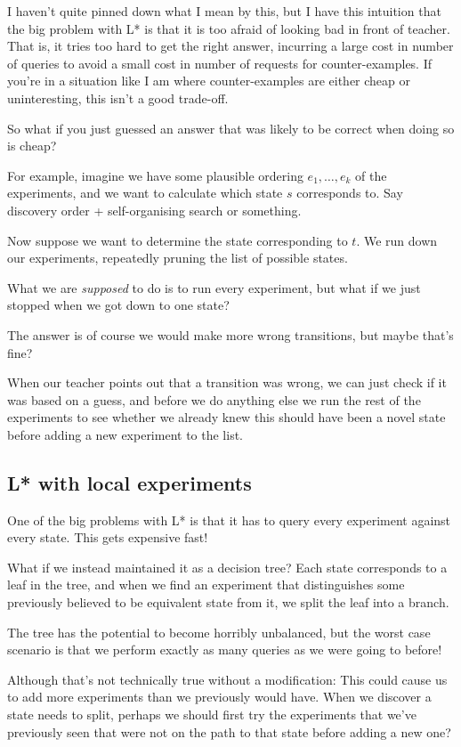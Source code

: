 \documentclass[a4paper]{book}
\begin{document}
I haven't quite pinned down what I mean by this,
but I have this intuition that the big problem with L* is that it is too afraid of looking bad in front of teacher.
That is,
it tries too hard to get the right answer,
incurring a large cost in number of queries to avoid a small cost in number of requests for counter-examples.
If you're in a situation like I am where counter-examples are either cheap or uninteresting,
this isn't a good trade-off.

So what if you just guessed an answer that was likely to be correct when doing so is cheap?

For example, imagine we have some plausible ordering \(e_1, \ldots, e_k\) of the experiments,
and we want to calculate which state \(s\) corresponds to.
Say discovery order + self-organising search or something.

Now suppose we want to determine the state corresponding to \(t\).
We run down our experiments,
repeatedly pruning the list of possible states.

What we are \emph{supposed} to do is to run every experiment,
but what if we just stopped when we got down to one state?

The answer is of course we would make more wrong transitions,
but maybe that's fine?

When our teacher points out that a transition was wrong,
we can just check if it was based on a guess,
and before we do anything else we run the rest of the experiments to see whether we already knew this should have been a novel state before adding a new experiment to the list.

\subsection{L* with local experiments}

One of the big problems with L* is that it has to query every experiment against every state.
This gets expensive fast!

What if we instead maintained it as a decision tree?
Each state corresponds to a leaf in the tree,
and when we find an experiment that distinguishes some previously believed to be equivalent state from it,
we split the leaf into a branch.

The tree has the potential to become horribly unbalanced,
but the worst case scenario is that we perform exactly as many queries as we were going to before!

Although that's not technically true without a modification:
This could cause us to add more experiments than we previously would have.
When we discover a state needs to split,
perhaps we should first try the experiments that we've previously seen that were not on the path to that state before adding a new one?
\end{document}
